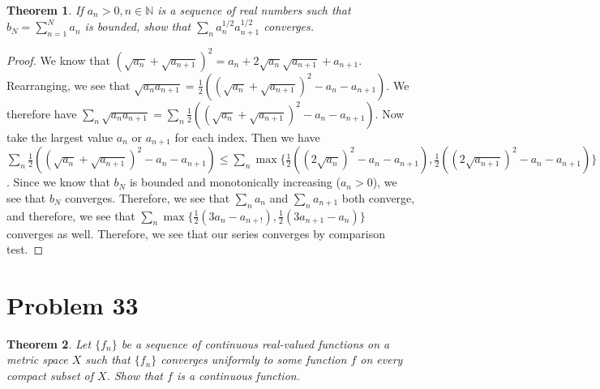\documentclass[psamsfonts]{amsart}
\newtheorem{thm}{Theorem}[section]
\theoremstyle{definition}
\theoremstyle{remark}
\numberwithin{equation}{section}
\begin{document}
\begin{thm}
If $a_n > 0, n \in \mathbb{N}$ is a sequence of real numbers such that $b_N = \sum_{n=1}^N a_n$ is bounded, show that $\sum_{n} a_n^{1/2} a_{n+1}^{1/2}$ converges.
\end{thm}

\begin{proof}
We know that $(\sqrt{a_n} + \sqrt{a_{n+1}})^2 = a_n + 2 \sqrt{a_n} \sqrt{a_{n+1}} + a_{n+1}$. Rearranging, we see that $\sqrt{a_n a_{n+1}} = \frac{1}{2} ( (\sqrt{a_n} + \sqrt{a_{n+1}})^2 - a_n - a_{n+1})$. We therefore have $\sum_{n} \sqrt{a_n a_{n+1}} = \sum_{n} \frac{1}{2} ( (\sqrt{a_n} + \sqrt{a_{n+1}})^2 - a_n - a_{n+1})$. Now take the largest value $a_n$ or $a_{n+1}$ for each index. Then we have $\sum_{n} \frac{1}{2} ( (\sqrt{a_n} + \sqrt{a_{n+1}})^2 - a_n - a_{n+1}) \leq \sum_{n} \max \{ \frac{1}{2} ((2 \sqrt{a_n})^2  - a_n - a_{n+1}), \frac{1}{2} ((2 \sqrt{a_{n+1}})^2 - a_n - a_{n+1}) \} = \sum_{n} \max \{ \frac{1}{2} (3 a_n - a_{n+1}), \frac{1}{2} (3 a_{n+1} - a_n)\}$. Since we know that $b_N$ is bounded and monotonically increasing ($a_n > 0$), we see that $b_N$ converges. Therefore, we see that $\sum_n a_n$ and $\sum_n a_{n+1}$ both converge, and therefore, we see that $\sum_{n} \max \{ \frac{1}{2} (3 a_n - a_{n+!}), \frac{1}{2} ( 3 a_{n+1} - a_n ) \}$ converges as well. Therefore, we see that our series converges by comparison test. 
\end{proof}

\section{Problem 33}

\begin{thm}
Let $\{ f_n \}$ be a sequence of continuous real-valued functions on a metric space $X$ such that $\{ f_n \}$ converges uniformly to some function $f$ on every compact subset of $X$. Show that $f$ is a continuous function.
\end{thm}
\end{document}
